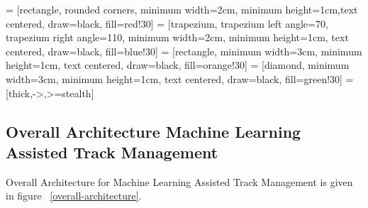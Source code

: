  = [rectangle, rounded corners, minimum width=2cm, minimum height=1cm,text centered, draw=black, fill=red!30]
 = [trapezium, trapezium left angle=70, trapezium right angle=110, minimum width=2cm, minimum height=1cm, text centered, draw=black, fill=blue!30]
 = [rectangle, minimum width=3cm, minimum height=1cm, text centered, draw=black, fill=orange!30]
 = [diamond, minimum width=3cm, minimum height=1cm, text centered, draw=black, fill=green!30]
 = [thick,->,>=stealth]

\subsection{Overall Architecture Machine Learning Assisted Track Management}
Overall Architecture for Machine Learning Assisted Track Management is given in figure ~\ref{overall-architecture}.
